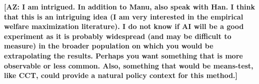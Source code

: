 \documentclass[12pt,letterpaper,doublespace, oneside]{article}
\begin{document}
\vspace{3em}

\noindent \textbf{[AZ: I am intrigued. In addition to Manu, also speak with Han. I think that this is an intriguing idea (I am very interested in the empirical welfare maximization literature). I do not know if AI will be a good experiment as it is probably widespread (and may be difficult to measure)  in the broader population on which you would be extrapolating the results. Perhaps you want something that is more observable or less common. Also, something that would be means-test, like CCT, could provide a natural policy context for this method.]}








\newpage


\end{document}
